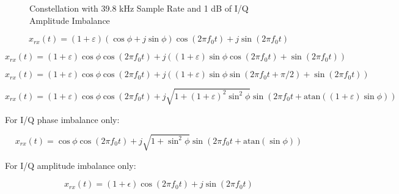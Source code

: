 \documentclass{article}
\begin{document}
\begin{figure}[H]
	\centerline{}
	\caption{Constellation with 39.8 kHz Sample Rate and 1 dB of I/Q Amplitude Imbalance}
	\label{fig::iq_imbalance_1_mag_0_phase_39p8k_samp_rate_const}
\end{figure}

\begin{equation}
	x_{rx}(t) = (1+\varepsilon)(\cos\phi + j\sin\phi)\cos(2{\pi}f_0t) + j\sin(2{\pi}f_0t)
\end{equation}

\begin{equation}
	x_{rx}(t) = (1+\varepsilon)\cos\phi\cos(2{\pi}f_0t) + j((1+\varepsilon)\sin\phi\cos(2{\pi}f_0t) + \sin(2{\pi}f_0t))
\end{equation}

\begin{equation}
	x_{rx}(t) = (1+\varepsilon)\cos\phi\cos(2{\pi}f_0t) + j((1+\varepsilon)\sin\phi\sin(2{\pi}f_0t + \pi/2) + \sin(2{\pi}f_0t))
\end{equation}

\begin{equation}
	x_{rx}(t) = (1+\varepsilon)\cos\phi\cos(2{\pi}f_0t) + j\sqrt{1+(1+\varepsilon)^2\sin^2\phi}\sin(2{\pi}f_0t + \text{atan}((1+\varepsilon)\sin\phi))
\end{equation}

For I/Q phase imbalance only:

\begin{equation}
	x_{rx}(t) = \cos\phi\cos(2{\pi}f_0t) + j\sqrt{1+\sin^2\phi}\sin(2{\pi}f_0t + \text{atan}(\sin\phi)) \label{eq::received_signal_phase_imbalance}
\end{equation}

For I/Q amplitude imbalance only:

\begin{equation}
	x_{rx}(t) = (1+\epsilon)\cos(2{\pi}f_0t) + j\sin(2{\pi}f_0t)
\end{equation}
\end{document}
